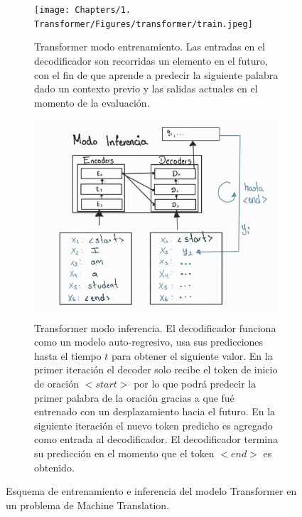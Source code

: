 \begin{figure}[ht!]
    \centering
    \begin{subfigure}[b]{0.49\textwidth}
        \centering
        \texttt{[image: Chapters/1. Transformer/Figures/transformer/train.jpeg]}
        \caption{Transformer modo entrenamiento. Las entradas en el decodificador son recorridas un
                 elemento en el futuro, con el fin de que aprende a predecir la siguiente palabra
                 dado un contexto previo y las salidas actuales en el momento de la evaluación.}
        \label{fig:trans_train}
    \end{subfigure}
    \begin{subfigure}[b]{0.49\textwidth}
        \centering
        \includegraphics[width=1.0 \textwidth]{Chapters/1. Transformer/Figures/transformer/inference.jpg}
        \caption{Transformer modo inferencia. El decodificador funciona como un modelo auto-regresivo,
        usa sus predicciones hasta el tiempo $t$ para obtener el siguiente valor. En la primer iteración
        el decoder solo recibe el token de inicio de oración $<start>$ por lo que podrá predecir la primer
        palabra de la oración gracias a que fué entrenado con un desplazamiento hacia el futuro. En la siguiente
        iteración el nuevo token predicho es agregado como entrada al decodificador. El decodificador
        termina su predicción en el momento que el token $<end>$ es obtenido.}
        \label{fig:trans_eval}
    \end{subfigure}
    \caption{Esquema de entrenamiento e inferencia del modelo Transformer en un problema de
             Machine Translation.}
        \label{fig:trans_te}
\end{figure}


